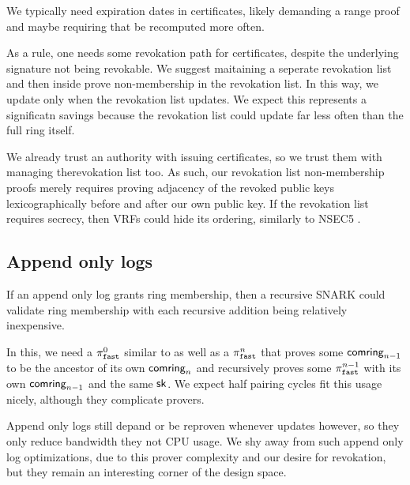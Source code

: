 We typically need expiration dates in certificates, likely demanding
a range proof and maybe requiring that \pifast be recomputed more often.


As a rule, one needs some revokation path for certificates,
despite the underlying signature not being revokable. 
%
We suggest maitaining a seperate revokation list and then inside
\pifast prove non-membership in the revokation list.
In this way, we update \pifast only when the revokation list updates.
We expect this represents a significatn savings because the revokation
list could update far less often than the full ring \ctx itself.

We already trust an authority with issuing certificates, so we trust
them with managing therevokation list too.  As such, our revokation list
non-membership proofs merely requires proving adjacency of the revoked
public keys lexicographically before and after our own public key.
If the revokation list requires secrecy, then VRFs could hide its ordering,
similarly to NSEC5 \cite{nsec5}.


\subsection{Append only logs}

If an append only log grants ring membership, then a recursive SNARK
could validate ring membership with each recursive addition being
relatively inexpensive.

In this, we need a $\pi_{\mathtt{fast}}^0$ similar to \pifast as well as a
$\pi_{\mathtt{fast}}^n$ that proves some $\mathsf{comring}_{n-1}$ to be the ancestor of
its own $\mathsf{comring}_n$ and recursively proves some $\pi_{\mathtt{fast}}^{n-1}$ with
its own $\mathsf{comring}_{n-1}$ and the same $\mathsf{sk}$.
We expect half pairing cycles fit this usage nicely, although they complicate provers.

Append only logs still depand \pifast or \pisafe be reproven whenever
\ctx updates however, so they only reduce bandwidth they not CPU usage.
We shy away from such append only log optimizations, due to this
prover complexity and our desire for revokation, but
 they remain an interesting corner of the design space.
